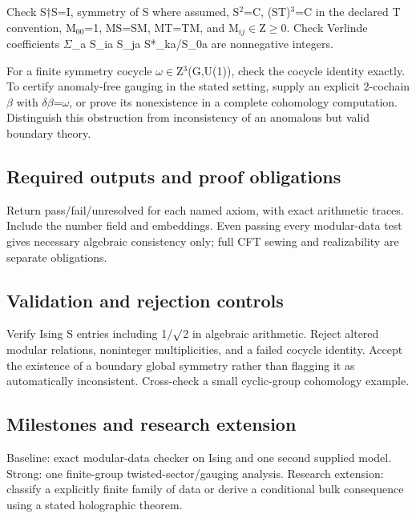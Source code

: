 \documentclass[
  11pt,
]{article}
\newcounter{none} %
\begin{document}
Check S\ensuremath{\dagger}S=I, symmetry of S where assumed,
S\ensuremath{{}^{2}}=C, (ST)\ensuremath{{}^{3}}=C in the declared T
convention, M\ensuremath{{}_{00}}=1, MS=SM, MT=TM, and
M\ensuremath{{}_{ij}}\ensuremath{\in}Z\ensuremath{\ge}0. Check Verlinde
coefficients \ensuremath{\Sigma}\_a S\_ia S\_ja S*\_ka/S\_0a are
nonnegative integers.

For a finite symmetry cocycle
\ensuremath{\omega}\ensuremath{\in}Z\ensuremath{{}^{3}}(G,U(1)), check
the cocycle identity exactly. To certify anomaly-free gauging in the
stated setting, supply an explicit 2-cochain \ensuremath{\beta} with
\ensuremath{\delta}\ensuremath{\beta}=\ensuremath{\omega}, or prove its
nonexistence in a complete cohomology computation. Distinguish this
obstruction from inconsistency of an anomalous but valid boundary
theory.

\subsection{Required outputs and proof obligations}

Return pass/fail/unresolved for each named axiom, with exact arithmetic
traces. Include the number field and embeddings. Even passing every
modular-data test gives necessary algebraic consistency only; full CFT
sewing and realizability are separate obligations.

\subsection{Validation and rejection controls}

Verify Ising S entries including 1/\ensuremath{\surd}2 in algebraic
arithmetic. Reject altered modular relations, noninteger multiplicities,
and a failed cocycle identity. Accept the existence of a boundary global
symmetry rather than flagging it as automatically inconsistent.
Cross-check a small cyclic-group cohomology example.

\subsection{Milestones and research extension}

Baseline: exact modular-data checker on Ising and one second supplied
model. Strong: one finite-group twisted-sector/gauging analysis.
Research extension: classify a explicitly finite family of data or
derive a conditional bulk consequence using a stated holographic
theorem.
\end{document}
